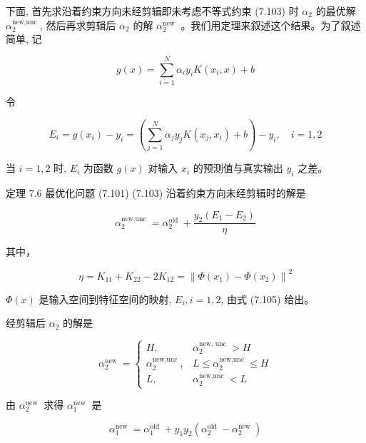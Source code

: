 \documentclass[10pt]{article}
\begin{document}
下面, 首先求沿着约束方向未经剪辑即未考虑不等式约束 (7.103) 时 $\alpha_{2}$ 的最优解 $\alpha_{2}^{\text {new,unc }}$, 然后再求剪辑后 $\alpha_{2}$ 的解 $\alpha_{2}^{\text {new }}$ 。我们用定理来叙述这个结果。为了叙述简单, 记


\begin{equation*}
g(x)=\sum_{i=1}^{N} \alpha_{i} y_{i} K\left(x_{i}, x\right)+b \tag{7.104}
\end{equation*}


令


\begin{equation*}
E_{i}=g\left(x_{i}\right)-y_{i}=\left(\sum_{j=1}^{N} \alpha_{j} y_{j} K\left(x_{j}, x_{i}\right)+b\right)-y_{i}, \quad i=1,2 \tag{7.105}
\end{equation*}


当 $i=1,2$ 时, $E_{i}$ 为函数 $g(x)$ 对输入 $x_{i}$ 的预测值与真实输出 $y_{i}$ 之差。

定理 7.6 最优化问题 (7.101) (7.103) 沿着约束方向未经剪辑时的解是


\begin{equation*}
\alpha_{2}^{\text {new,unc }}=\alpha_{2}^{\text {old }}+\frac{y_{2}\left(E_{1}-E_{2}\right)}{\eta} \tag{7.106}
\end{equation*}


其中，


\begin{equation*}
\eta=K_{11}+K_{22}-2 K_{12}=\left\|\Phi\left(x_{1}\right)-\Phi\left(x_{2}\right)\right\|^{2} \tag{7.107}
\end{equation*}


$\Phi(x)$ 是输入空间到特征空间的映射, $E_{i}, i=1,2$, 由式 (7.105) 给出。

经剪辑后 $\alpha_{2}$ 的解是

\[
\alpha_{2}^{\text {new }}= \begin{cases}H, & \alpha_{2}^{\text {new, unc }}>H  \tag{7.108}\\ \alpha_{2}^{\text {new,unc }}, & L \leqslant \alpha_{2}^{\text {new,unc }} \leqslant H \\ L, & \alpha_{2}^{\text {new,unc }}<L\end{cases}
\]

由 $\alpha_{2}^{\text {new }}$ 求得 $\alpha_{1}^{\text {new }}$ 是


\begin{equation*}
\alpha_{1}^{\text {new }}=\alpha_{1}^{\text {old }}+y_{1} y_{2}\left(\alpha_{2}^{\text {old }}-\alpha_{2}^{\text {new }}\right) \tag{7.109}
\end{equation*}
\end{document}
